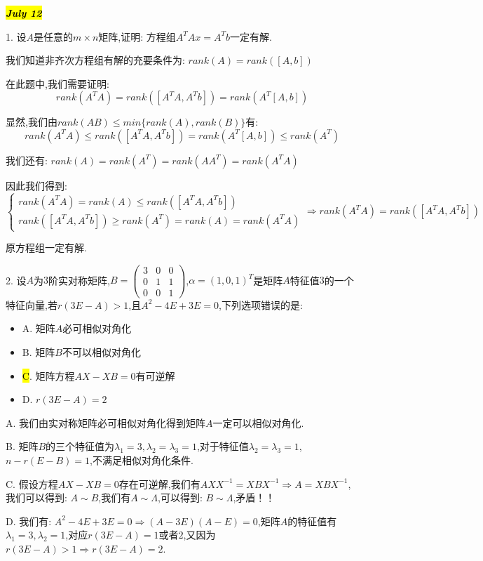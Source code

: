\hl{\textbf{\textit{July 12}}}

1. 设$A$是任意的$m\times n$矩阵,证明: $\text{方程组}A^{T}Ax=A^{T}b$一定有解.
\begin{solution}
	
	我们知道非齐次方程组有解的充要条件为: $rank(A)=rank([A,b])$
	
	在此题中,我们需要证明: $$rank(A^TA)=rank([A^TA,A^Tb])=rank(A^T[A,b])$$
	
	显然,我们由$rank(AB)\leq min\{rank(A),rank(B)\}$有: 
	$$rank(A^TA)\leq rank([A^TA,A^Tb])=rank(A^T[A,b])\leq rank(A^T)$$
	
	我们还有: $rank(A)=rank(A^T)=rank(AA^T)=rank(A^TA)$
	
	因此我们得到: 
	$$\left\lbrace
	\begin{array}{l}
		rank(A^TA)=rank(A)\leq rank([A^TA,A^Tb])\\
		rank([A^TA,A^Tb])\geq rank(A^T)=rank(A)=rank(A^TA)
	\end{array}
	\right. \Rightarrow rank(A^TA)=rank([A^TA,A^Tb])$$
	
	原方程组一定有解.
\end{solution}

2. 设$A$为$3$阶实对称矩阵,$B=\left( \begin{matrix}
	3&0&0\\0&1&1\\0&0&1
\end{matrix}\right) $,$\alpha=(1,0,1)^{T}$是矩阵$A$特征值$3$的一个特征向量,若$r(3E-A)>1$,且$A^2-4E+3E=0$,下列选项错误的是: 
\begin{itemize}
	\item A. 矩阵$A$必可相似对角化
	\item B. 矩阵$B$不可以相似对角化
	\item \hl{C}. 矩阵方程$AX-XB=0$有可逆解
	\item D. $r(3E-A)=2$
\end{itemize}
\begin{solution}
	
	A. 我们由实对称矩阵必可相似对角化得到矩阵$A$一定可以相似对角化.
	
	B. 矩阵$B$的三个特征值为$\lambda_{1}=3,\lambda_{2}=\lambda_{3}=1$,对于特征值$\lambda_{2}=\lambda_{3}=1$,$n-r(E-B)=1$,不满足相似对角化条件.
	
	C. 假设方程$AX-XB=0$存在可逆解,我们有$AXX^{-1}=XBX^{-1}\Rightarrow A=XBX^{-1}$,我们可以得到: $A\sim B$,我们有$A\sim\varLambda$,可以得到: $B\sim\varLambda$,矛盾！！
	
	D. 我们有: $A^2-4E+3E=0\Rightarrow (A-3E)(A-E)=0$,矩阵$A$的特征值有$\lambda_{1}=3,\lambda_{2}=1$,对应$r(3E-A)=1\text{或者}2$,又因为$r(3E-A)>1\Rightarrow r(3E-A)=2$.
\end{solution}

